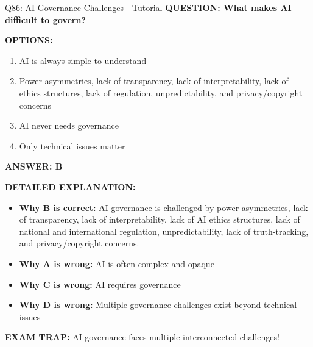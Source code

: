 \documentclass[8pt]{beamer}
\begin{document}
	\begin{frame}{Q86: AI Governance Challenges - Tutorial}
		\fontsize{6.5}{7.5}\selectfont
		\textbf{QUESTION: What makes AI difficult to govern?}
		
		\vspace{0.1cm}
		\textbf{OPTIONS:}
		\begin{enumerate}
			\item AI is always simple to understand
			\item Power asymmetries, lack of transparency, lack of interpretability, lack of ethics structures, lack of regulation, unpredictability, and privacy/copyright concerns
			\item AI never needs governance
			\item Only technical issues matter
		\end{enumerate}
		
		\vspace{0.1cm}
		\textcolor{myblue}{\textbf{ANSWER: B}}
		
		\vspace{0.1cm}
		\textbf{DETAILED EXPLANATION:}
		\begin{itemize}
			\item \textbf{Why B is correct:} AI governance is challenged by power asymmetries, lack of transparency, lack of interpretability, lack of AI ethics structures, lack of national and international regulation, unpredictability, lack of truth-tracking, and privacy/copyright concerns.
			\item \textbf{Why A is wrong:} AI is often complex and opaque
			\item \textbf{Why C is wrong:} AI requires governance
			\item \textbf{Why D is wrong:} Multiple governance challenges exist beyond technical issues
		\end{itemize}
		
		\textcolor{myred}{\textbf{EXAM TRAP:}} AI governance faces \textcolor{myblue}{multiple interconnected challenges}!
	\end{frame}
	
\end{document}
